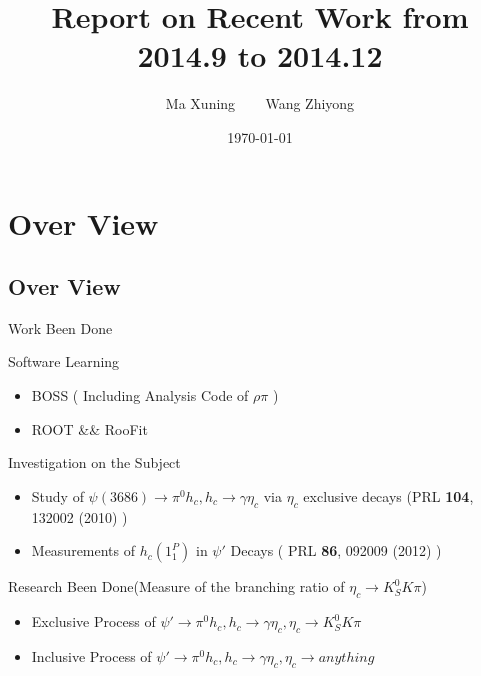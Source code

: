 \documentclass{beamer}
\title[Work Report]{Report on Recent Work from 2014.9 to 2014.12}
\author{Ma Xuning ~~~ Wang Zhiyong}
\institute[NKU \& \& IHEP]
{
    Nankai Univ. \&\& IHEP\\
    \medskip
    \textit{maxn@ihep.ac.cn}
}
\date{\today}
\begin{document}
\frame{\titlepage}

\section{Over View}
\subsection{Over View}
\begin{frame}{Work Been Done}
\begin{block}{Software Learning}
\begin{itemize}
\item BOSS ( Including Analysis Code of $\rho\pi$ )
\item ROOT \&\& RooFit
\end{itemize}
\end{block}
\begin{block}{Investigation on the Subject}
\begin{itemize}
\item Study of $\psi(3686)\rightarrow \pi^0h_c, h_c\rightarrow\gamma\eta_c$ via $\eta_c$ exclusive decays (PRL \textbf{104}, 132002 (2010) )
\item Measurements of $h_c(1^P_1)$ in $\psi\prime$ Decays ( PRL \textbf{86}, 092009 (2012) )
\end{itemize}
\end{block}
\begin{block}{Research Been Done(Measure of the branching ratio of $\eta_c\rightarrow K^0_S K \pi$)}
\begin{itemize}
\item Exclusive Process of $\psi\prime\rightarrow\pi^0h_c,h_c\rightarrow\gamma\eta_c,\eta_c\rightarrow K^0_S K \pi$
\item Inclusive Process of $\psi\prime\rightarrow\pi^0h_c,h_c\rightarrow\gamma\eta_c,\eta_c\rightarrow anything$
\end{itemize}
\end{block}
\end{frame}

\end{document}

